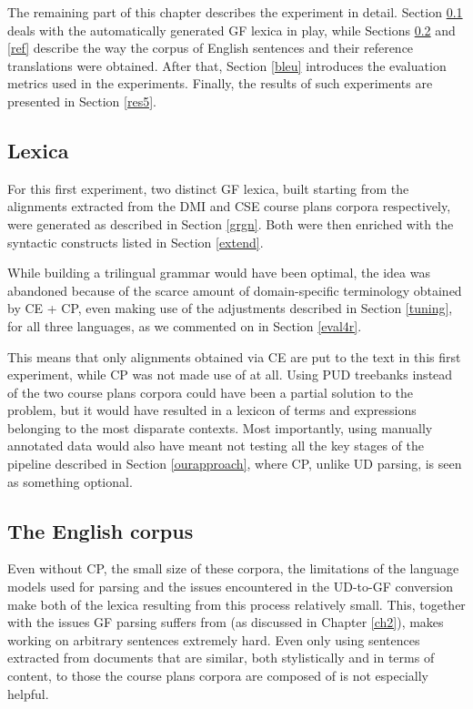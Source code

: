 The remaining part of this chapter describes the experiment in detail. Section \ref{gr} deals with the automatically generated GF lexica in play, while Sections \ref{eng} and \ref{ref} describe the way the corpus of English sentences and their reference translations were obtained. After that, Section \ref{bleu} introduces the evaluation metrics used in the experiments. Finally, the results of such experiments are presented in Section \ref{res5}.

\subsection{Lexica} \label{gr}
For this first experiment, two distinct GF lexica, built starting from the alignments extracted from the DMI and CSE course plans corpora respectively, were generated as described in Section \ref{grgn}. Both were then enriched with the syntactic constructs listed in Section \ref{extend}. \smallskip

While building a trilingual grammar would have been optimal, the idea was abandoned because of the scarce amount of domain-specific terminology obtained by CE + CP, even making use of the adjustments described in Section \ref{tuning}, for all three languages, as we commented on in Section \ref{eval4r}. \smallskip

This means that only alignments obtained via CE are put to the text in this first experiment, while CP was not made use of at all. 
Using PUD treebanks instead of the two course plans corpora could have been a partial solution to the problem, but it would have resulted in a lexicon of terms and expressions belonging to the most disparate contexts.
Most importantly, using manually annotated data would also have meant not testing all the key stages of the pipeline described in Section \ref{ourapproach}, where CP, unlike UD parsing, is seen as something optional.
\smallskip

\subsection{The English corpus} \label{eng}
Even without CP, the small size of these corpora, the limitations of the language models used for parsing and the issues encountered in the UD-to-GF conversion make both of the lexica resulting from this process relatively small.
This, together with the issues GF parsing suffers from (as discussed in Chapter \ref{ch2}), makes working on arbitrary sentences extremely hard. Even only using sentences extracted from documents that are similar, both stylistically and in terms of content, to those the course plans corpora are composed of is not especially helpful. \smallskip

